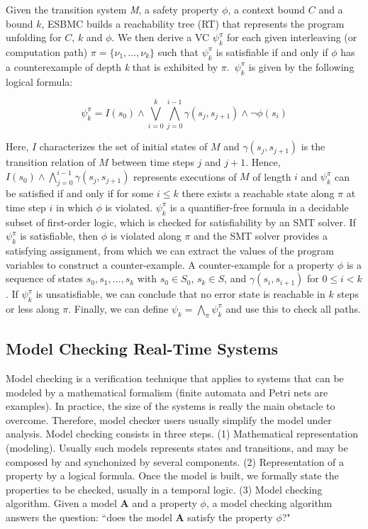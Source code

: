 \documentclass{llncs}
\begin{document}
Given the transition system \textit{M}, a safety property $\phi$, a context bound $C$ and a bound $k$, 
ESBMC builds a reachability tree (RT) that represents the program unfolding for $C$, $k$ and $\phi$. 
We then derive a VC $\psi^{\pi}_{k}$ for each given interleaving (or computation path) $\pi = \{\nu_1,\ldots, \nu_k\}$ such that $\psi^{\pi}_{k}$ 
is satisfiable if and only if $\phi$ has a counterexample of depth \textit{k} that is exhibited by $\pi$.\ $\psi^{\pi}_{k}$ is given by 
the following logical formula:

\begin{equation} \label{bounded-model-checking} \psi^{\pi}_{k} =
I(s_{0})
\wedge
  \bigvee^{k}_{i=0} \bigwedge^{i-1}_{j=0} \gamma(s_{j},s_{j+1})
\wedge
  \neg \phi(s_i)
\end{equation}

Here, $I$ characterizes the set of initial states of $M$ and $\gamma(s_{j},s_{j+1})$ is the transition relation of $M$ 
between time steps $j$ and $j+1$. Hence, $I(s_0)\wedge\bigwedge^{i-1}_{j=0} \gamma(s_{j},s_{j+1})$ represents 
executions of $M$ of length $i$ and $\psi^{\pi}_{k}$ can be satisfied if and only if for some $i \leq k$ there exists 
a reachable state along $\pi$ at time step $i$ in which $\phi$ is violated. $\psi^{\pi}_{k}$ is a quantifier-free 
formula in a decidable subset of first-order logic, which is checked for satisfiability by an SMT solver. 
If $\psi^{\pi}_{k}$ is satisfiable, then $\phi$ is violated along $\pi$ and the SMT solver provides a satisfying assignment, 
from which we can extract the values of the program variables to construct a counter-example. 
A counter-example for a property $\phi$ is a sequence of states $s_{0}, s_{1},\ldots, s_{k}$ 
with $s_{0} \in S_{0}$, $s_{k} \in S$, and $\gamma\left(s_{i}, s_{i+1}\right)$ for $0 \leq i < k$. 
If $\psi^{\pi}_{k}$ is unsatisfiable, we can conclude that no error state is reachable in $k$ steps or less along $\pi$. 
Finally, we can define $\psi_{k} = \bigwedge_{\pi}\psi^{\pi}_{k}$ and use this to check all paths. 


\subsection{Model Checking Real-Time Systems}

Model checking is a verification technique that applies to systems that can be modeled by a mathematical 
formalism (finite automata and Petri nets are examples). 
In practice, the size of the systems is really the main obstacle to overcome.
Therefore, model checker users usually simplify the model under analysis.
Model checking consists in three steps.
(1) Mathematical representation (modeling). 
Usually such models represents states and transitions, and may be composed by and synchonized by several components. 
(2) Representation of a property by a logical formula. 
Once the model is built, we formally state the properties to be checked, usually in a temporal logic.
(3) Model checking algorithm. 
Given a model $\mathbf{A}$ and a property $\phi$, a model checking algorithm answers the question: 
``does the model $\mathbf{A}$ satisfy the property $\phi$?"
\end{document}

